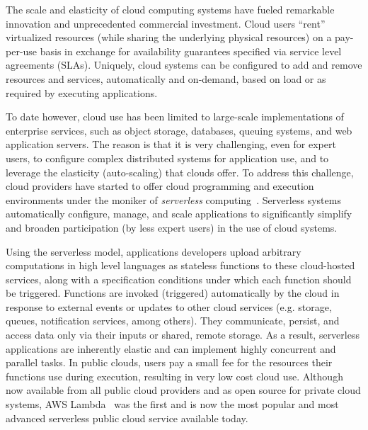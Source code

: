 The scale and elasticity of cloud computing systems have 
fueled remarkable innovation and unprecedented commercial 
investment.  Cloud users ``rent'' virtualized resources (while sharing
the underlying physical resources) on a pay-per-use basis
in exchange for availability guarantees specified via service level
agreements (SLAs). Uniquely, cloud systems can be configured 
to add and remove resources and services,
automatically and on-demand, based on load 
or as required by executing applications.

To date however, cloud use has been limited to large-scale 
implementations of enterprise services, such as
object storage, databases, queuing systems, and web application servers.
The reason is that it is very
challenging, even for expert users, to configure complex
distributed systems for application use, 
and to leverage the elasticity (auto-scaling) that
clouds offer. To address this challenge, cloud providers 
have started to offer cloud programming and execution environments
under the moniker of \textit{serverless} 
computing~\cite{ref:jonas2017occupy, ref:onesteptwostep, ref:peeking}.  Serverless
systems automatically configure, manage, and scale applications
to significantly simplify and broaden participation (by less expert
users) in the use of cloud systems.

Using the serverless model, applications developers upload 
arbitrary computations in high level languages
as stateless functions to these cloud-hosted services, along with a
specification conditions under which each
function should be triggered.  Functions are invoked (triggered)
automatically by the cloud in response to external events or updates to other cloud services
(e.g. storage, queues, notification services, among others). They
communicate, persist, and access data only 
via their inputs or shared, remote storage.  
As a result, serverless applications are inherently elastic and can 
implement highly concurrent and parallel tasks.
In public clouds, users pay a small fee for the resources their 
functions use during execution, resulting in very low cost cloud use.
Although now available from all public cloud providers and as open 
source for private cloud systems, 
AWS Lambda~\cite{ref:awslambdadg} was the first and is now the 
most popular and most advanced serverless public cloud service 
available today.

